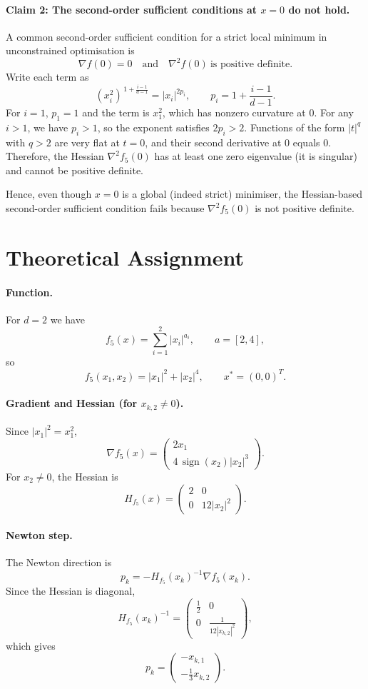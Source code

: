 \documentclass[12pt,a4paper]{article}
\begin{document}
\paragraph{Claim 2: The second-order sufficient conditions at $x=0$ do not hold.}
A common second-order sufficient condition for a strict local minimum in unconstrained optimisation is
\[
\nabla f(0)=0
\quad \text{and} \quad
\nabla^2 f(0)\ \text{is positive definite}.
\]
Write each term as
\[
\left(x_i^2\right)^{\,1+\frac{i-1}{d-1}} = |x_i|^{2p_i},
\qquad
p_i = 1+\frac{i-1}{d-1}.
\]
For $i=1$, $p_1=1$ and the term is $x_1^2$, which has nonzero curvature at $0$. For any $i>1$, we have $p_i>1$, so the exponent satisfies $2p_i>2$. Functions of the form $|t|^{q}$ with $q>2$ are very flat at $t=0$, and their second derivative at $0$ equals $0$. Therefore, the Hessian $\nabla^2 f_5(0)$ has at least one zero eigenvalue (it is singular) and cannot be positive definite.

Hence, even though $x=0$ is a global (indeed strict) minimiser, the Hessian-based second-order sufficient condition fails because $\nabla^2 f_5(0)$ is not positive definite.




\section{Theoretical Assignment}

\paragraph{Function.}
For $d=2$ we have
\[
f_5(x)=\sum_{i=1}^2 |x_i|^{a_i},
\qquad a=[2,4],
\]
so
\[
f_5(x_1,x_2)=|x_1|^2+|x_2|^4,
\qquad x^*=(0,0)^T.
\]

\paragraph{Gradient and Hessian (for $x_{k,2}\neq0$).}
Since $|x_1|^2=x_1^2$,
\[
\nabla f_5(x)=
\begin{pmatrix}
2x_1\\
4\,\operatorname{sign}(x_2)|x_2|^3
\end{pmatrix}.
\]
For $x_2\neq0$, the Hessian is
\[
H_{f_5}(x)=
\begin{pmatrix}
2 & 0\\
0 & 12|x_2|^2
\end{pmatrix}.
\]

\paragraph{Newton step.}
The Newton direction is
\[
p_k=-H_{f_5}(x_k)^{-1}\nabla f_5(x_k).
\]
Since the Hessian is diagonal,
\[
H_{f_5}(x_k)^{-1}=
\begin{pmatrix}
\frac12 & 0\\
0 & \frac{1}{12|x_{k,2}|^2}
\end{pmatrix},
\]
which gives
\[
p_k=
\begin{pmatrix}
- x_{k,1}\\
-\frac13 x_{k,2}
\end{pmatrix}.
\]
\end{document}
